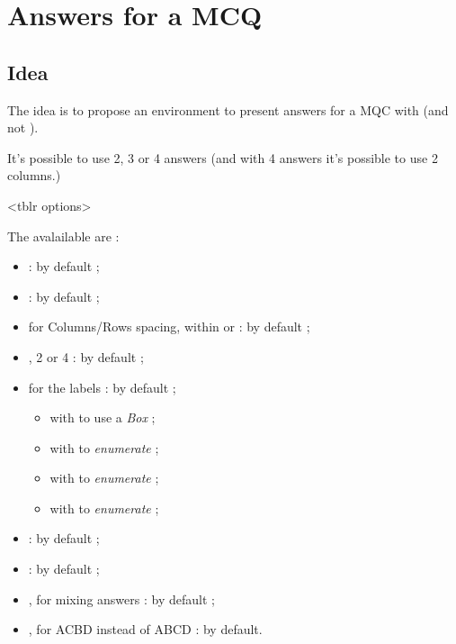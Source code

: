 \documentclass[english,11pt,a4paper]{article}
\begin{document}
\section{Answers for a MCQ}

\subsection{Idea}

The idea is to propose an environment to present answers for a MQC with  (and not ).

\smallskip

It's possible to use 2, 3 or 4 answers (and with 4 answers it's possible to use 2 columns.)

\begin{codehigh}[language=latex/latex3,style/main=teal!25,style/code=teal!25]
<tblr options>
\end{codehigh}

The avalailable  are :

\begin{itemize}
	\item {} :  by default ;
	\item {}  :  by default ;
	\item {} for Columns/Rows spacing, within  or  : \MontreCode{6pt/2pt} by default ;
	\item {}, 2 or 4 :  by default ;
	\item {} for the labels :  by default ;
	\begin{itemize}
		\item with  to use a \textit{Box} ;
		\item with  to \textit{enumerate}  ;
		\item with  to \textit{enumerate}  ;
		\item with  to \textit{enumerate}  ;
	\end{itemize}
	\item {} :  by default ;
	\item {} :  by default ;
	\item {}, for mixing answers :  by default ;
	\item {}, for ACBD instead of ABCD :  by default.
\end{itemize}
\end{document}
